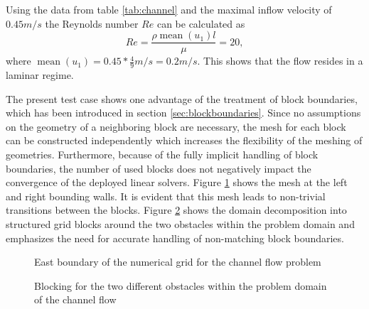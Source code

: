 Using the data from table \ref{tab:channel} and the maximal inflow velocity of $0.45m/s$ the Reynolds number \(Re\) can be calculated as
\begin{displaymath}
  Re = \frac{\rho \operatorname{mean}(u_1) l}{\mu} = 20,
\end{displaymath}
where \(\operatorname{mean}(u_1) = 0.45*\frac{4}{9} m/s = 0.2 m/s\). This shows that the flow resides in a laminar regime.

The present test case shows one advantage of the treatment of block boundaries, which has been introduced in section \ref{sec:blockboundaries}. Since no assumptions on the geometry of a neighboring block are necessary, the mesh for each block can be constructed independently which increases the flexibility of the meshing of geometries. Furthermore, because of the fully implicit handling of block boundaries, the number of used blocks does not negatively impact the convergence of the deployed linear solvers. Figure \ref{fig:channel1} shows the mesh at the left and right bounding walls. It is evident that this mesh leads to non-trivial transitions between the blocks. Figure \ref{fig:blocking} shows the domain decomposition into structured grid blocks around the two obstacles within the problem domain and emphasizes the need for accurate handling of non-matching block boundaries.

\begin{figure}
  \centering
  
  \caption{East boundary of the numerical grid for the channel flow problem}
  \label{fig:channel1}
\end{figure}

%  

\begin{figure}
   \label{fig:cellvertex}
   \centering
    \hfil
    \caption{Blocking for the two different obstacles within the problem domain of the channel flow}
    \label{fig:blocking}
\end{figure}

